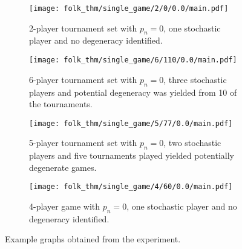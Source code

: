 \begin{figure}
    \begin{subfigure}{0.45\textwidth}
        \centering
        \texttt{[image: folk\_thm/single\_game/2/0/0.0/main.pdf]}
        \caption{2-player tournament set with \(p_{n}=0\), one stochastic player and no degeneracy identified.}\label{subfig:clear_thresh_plot}
    \end{subfigure}
    \begin{subfigure}{0.45\textwidth}
        \centering
        \texttt{[image: folk\_thm/single\_game/6/110/0.0/main.pdf]}
        \caption{6-player tournament set with \(p_{n}=0\), three stochastic players and potential degeneracy was yielded from 10 of the tournaments.}\label{subfig:unclear_thresh_plot}
    \end{subfigure}

    \begin{subfigure}{0.45\textwidth}
        \centering
        \texttt{[image: folk\_thm/single\_game/5/77/0.0/main.pdf]}
        \caption{5-player tournament set with \(p_{n}=0\), two stochastic players and five tournaments played yielded potentially degenerate games.}\label{subfig:degenerate_plot}
    \end{subfigure}
    \begin{subfigure}{0.45\textwidth}
        \centering
        \texttt{[image: folk\_thm/single\_game/4/60/0.0/main.pdf]}
        \caption{4-player game with \(p_{n}=0\), one stochastic player and no degeneracy identified.}\label{subfig:constant_plot}
    \end{subfigure}
    \caption{Example graphs obtained from the experiment.}\label{fig:example_graphs}
\end{figure}

